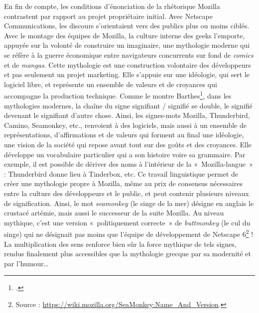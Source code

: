 \documentclass{FramateX}
\begin{document}
\begin{refsection}
En fin de compte, les conditions d'énonciation de la rhétorique Mozilla
contrastent par rapport au projet propriétaire initial. Avec Netscape
Communications, les discours s'orientaient vers des publics plus ou
moins ciblés. Avec le montage des équipes de Mozilla, la culture
interne des geeks l'emporte, appuyée sur la volonté de construire un
imaginaire, une mythologie moderne qui se réfère à la guerre économique
entre navigateurs concurrents sur fond de \emph{comics} et de
\textit{mangas}. Cette mythologie est une construction volontaire des
développeurs et pas seulement un projet marketing. Elle s'appuie sur
une idéologie, qui sert le logiciel libre, et représente un ensemble de
valeurs et de croyances qui accompagne la production technique. Comme
le montre Barthes\footnote{\cite{barthesmythologies1957}.}, dans les mythologies modernes, la chaîne du
signe signifiant / signifié se double, le signifié devenant le
signifiant d'autre chose. Ainsi, les signes-mots Mozilla, Thunderbird,
Camino, Seamonkey, etc., renvoient à des logiciels, mais aussi à un
ensemble de représentations, d'affirmations et de valeurs qui forment
au final une idéologie, une vision de la société qui repose avant tout
sur des goûts et des croyances. Elle développe un vocabulaire
particulier qui a son histoire voire sa grammaire. Par exemple, il est
possible de dériver des noms à l'intérieur de la «~Mozilla-langue~» :
Thunderbird donne lieu à Tinderbox, etc. Ce travail linguistique permet
de créer une mythologie propre à Mozilla, même au prix de consensus
nécessaires entre la culture des développeurs et le public, et peut
contenir plusieurs niveaux de signification. Ainsi, le mot
\textit{seamonkey} (le singe de la mer) désigne en anglais le crustacé
artémie, mais aussi le successeur de la suite Mozilla. Au niveau
mythique, c'est une version «~politiquement correcte~» de
\textit{buttmonkey} (le cul du singe) qui ne désignait pas moins que
l'équipe de développement de Netscape
6\footnote{Source : \url{https://wiki.mozilla.org/SeaMonkey:Name_And_Version}.} ! La
multiplication des sens renforce bien sûr la force mythique de tels
signes, rendus finalement plus accessibles que la mythologie grecque
par sa modernité et par l'humour\ldots


\end{refsection}
\end{document}
